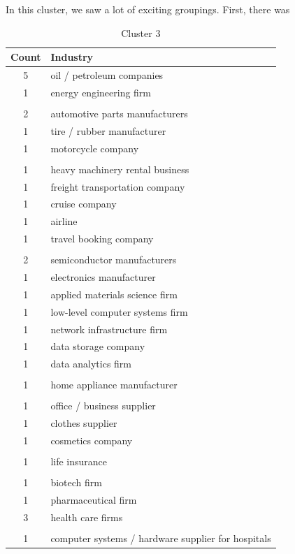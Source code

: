 \documentclass[final]{article}
\begin{document}
In this cluster, we saw a lot of exciting groupings. First, there was
\begin{table}[H]
\centering
\caption{Cluster 3}
\label{c3}
\begin{tabular}{@{}cl@{}}
  \toprule
  Count & Industry \\ \midrule
  5 & oil / petroleum companies \\
  1 & energy engineering firm \\
    & \\
  2 & automotive parts manufacturers \\
  1 & tire / rubber manufacturer \\
  1 & motorcycle company \\
    & \\
  1 & heavy machinery rental business \\
  1 & freight transportation company \\
  1 & cruise company \\
  1 & airline \\
  1 & travel booking company \\
    & \\
  2 & semiconductor manufacturers \\
  1 & electronics manufacturer \\
  1 & applied materials science firm \\
  1 & low-level computer systems firm \\
  1 & network infrastructure firm \\
  1 & data storage company \\
  1 & data analytics firm  \\
    & \\
  1 & home appliance manufacturer \\
  & \\
  1 & office / business supplier \\
  1 & clothes supplier \\
  1 & cosmetics company \\
  & \\
  1 & life insurance \\
  & \\
  1 & biotech firm \\
  1 & pharmaceutical firm \\
  3 & health care firms \\
  & \\
  1 & computer systems / hardware supplier for hospitals \\

\end{tabular}
\end{table}
\end{document}
